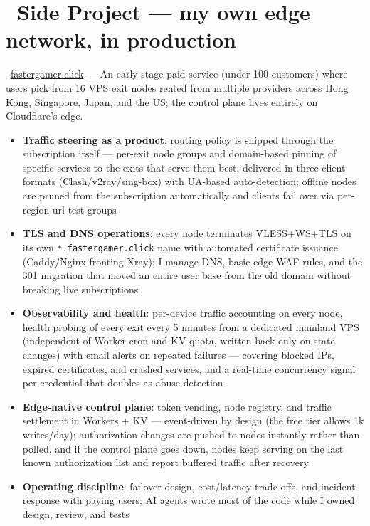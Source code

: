 \documentclass{resume}
\begin{document}
\section{\faLightbulbO\ Side Project --- my own edge network, in production}
\begin{singlespacing}
\faGlobe\ \href{https://fastergamer.click}{fastergamer.click} ---
An early-stage paid service (under 100 customers) where users pick from 16 VPS exit nodes rented from multiple providers across Hong Kong, Singapore, Japan, and the US; the control plane lives entirely on Cloudflare's edge.
\begin{itemize}
    \item \textbf{Traffic steering as a product}: routing policy is shipped through the subscription itself --- per-exit node groups and domain-based pinning of specific services to the exits that serve them best, delivered in three client formats (Clash/v2ray/sing-box) with UA-based auto-detection; offline nodes are pruned from the subscription automatically and clients fail over via per-region url-test groups
    \item \textbf{TLS and DNS operations}: every node terminates VLESS+WS+TLS on its own \texttt{*.fastergamer.click} name with automated certificate issuance (Caddy/Nginx fronting Xray); I manage DNS, basic edge WAF rules, and the 301 migration that moved an entire user base from the old domain without breaking live subscriptions
    \item \textbf{Observability and health}: per-device traffic accounting on every node, health probing of every exit every 5 minutes from a dedicated mainland VPS (independent of Worker cron and KV quota, written back only on state changes) with email alerts on repeated failures --- covering blocked IPs, expired certificates, and crashed services, and a real-time concurrency signal per credential that doubles as abuse detection
    \item \textbf{Edge-native control plane}: token vending, node registry, and traffic settlement in Workers + KV --- event-driven by design (the free tier allows 1k writes/day); authorization changes are pushed to nodes instantly rather than polled, and if the control plane goes down, nodes keep serving on the last known authorization list and report buffered traffic after recovery
    \item \textbf{Operating discipline}: failover design, cost/latency trade-offs, and incident response with paying users; AI agents wrote most of the code while I owned design, review, and tests
\end{itemize}
\end{singlespacing}
\end{document}
